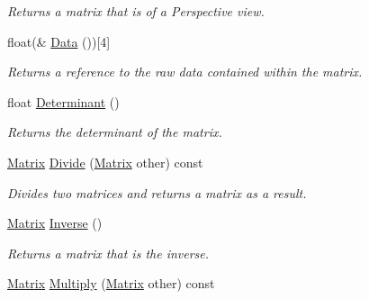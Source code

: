 \begin{DoxyCompactItemize}
\begin{DoxyCompactList}\small\item\em Returns a matrix that is of a Perspective view. \end{DoxyCompactList}\item 
\hypertarget{struct_jade_1_1_math_1_1_matrix_a23ed117800c7c6734930f84a7c864c1a}{}float(\& \hyperlink{struct_jade_1_1_math_1_1_matrix_a23ed117800c7c6734930f84a7c864c1a}{Data} ())\mbox{[}4\mbox{]}\label{struct_jade_1_1_math_1_1_matrix_a23ed117800c7c6734930f84a7c864c1a}

\begin{DoxyCompactList}\small\item\em Returns a reference to the raw data contained within the matrix. \end{DoxyCompactList}\item 
\hypertarget{struct_jade_1_1_math_1_1_matrix_a8b030138c16b571491ec6880269a9bed}{}float \hyperlink{struct_jade_1_1_math_1_1_matrix_a8b030138c16b571491ec6880269a9bed}{Determinant} ()\label{struct_jade_1_1_math_1_1_matrix_a8b030138c16b571491ec6880269a9bed}

\begin{DoxyCompactList}\small\item\em Returns the determinant of the matrix. \end{DoxyCompactList}\item 
\hypertarget{struct_jade_1_1_math_1_1_matrix_a6dff4eaa15baad168ba91920b1ceaf93}{}\hyperlink{struct_jade_1_1_math_1_1_matrix}{Matrix} \hyperlink{struct_jade_1_1_math_1_1_matrix_a6dff4eaa15baad168ba91920b1ceaf93}{Divide} (\hyperlink{struct_jade_1_1_math_1_1_matrix}{Matrix} other) const \label{struct_jade_1_1_math_1_1_matrix_a6dff4eaa15baad168ba91920b1ceaf93}

\begin{DoxyCompactList}\small\item\em Divides two matrices and returns a matrix as a result. \end{DoxyCompactList}\item 
\hypertarget{struct_jade_1_1_math_1_1_matrix_a922429ce3242f0df5d2987dfe7de238b}{}\hyperlink{struct_jade_1_1_math_1_1_matrix}{Matrix} \hyperlink{struct_jade_1_1_math_1_1_matrix_a922429ce3242f0df5d2987dfe7de238b}{Inverse} ()\label{struct_jade_1_1_math_1_1_matrix_a922429ce3242f0df5d2987dfe7de238b}

\begin{DoxyCompactList}\small\item\em Returns a matrix that is the inverse. \end{DoxyCompactList}\item 
\hypertarget{struct_jade_1_1_math_1_1_matrix_a449adacaa4ef60d602e95f73d0d12c8a}{}\hyperlink{struct_jade_1_1_math_1_1_matrix}{Matrix} \hyperlink{struct_jade_1_1_math_1_1_matrix_a449adacaa4ef60d602e95f73d0d12c8a}{Multiply} (\hyperlink{struct_jade_1_1_math_1_1_matrix}{Matrix} other) const \label{struct_jade_1_1_math_1_1_matrix_a449adacaa4ef60d602e95f73d0d12c8a}


\end{DoxyCompactItemize}
